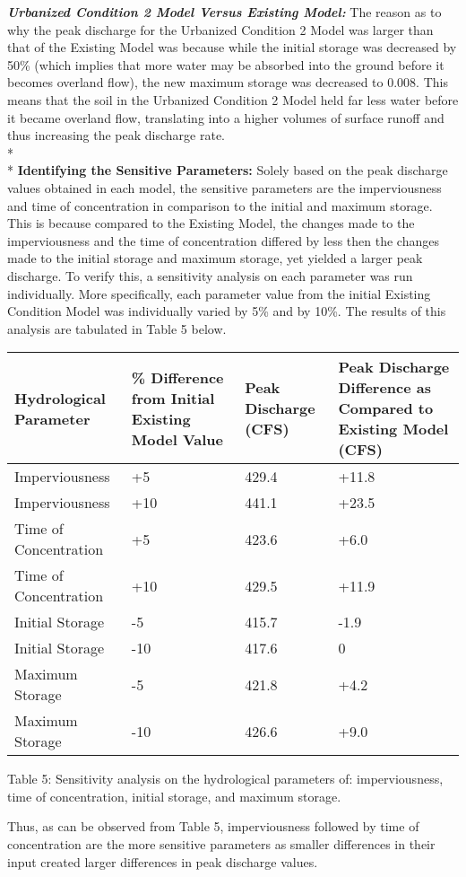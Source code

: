 \documentclass[]{article}
\begin{document}
\begin{enumerate}[label=\textbf{\arabic*.}]
	\textit{\textbf{Urbanized Condition 2 Model Versus Existing Model:}} The reason as to why the peak discharge for the Urbanized Condition 2 Model was larger than that of the Existing Model was because while the initial storage was decreased by 50\% (which implies that more water may be absorbed into the ground before it becomes overland flow), the new maximum storage was decreased to 0.008. This means that the soil in the Urbanized Condition 2 Model held far less water before it became overland flow, translating into a higher volumes of surface runoff and thus increasing the peak discharge rate. \\* \\* 
	\textbf{Identifying the Sensitive Parameters:} Solely based on the peak discharge values obtained in each model, the sensitive parameters are the imperviousness and time of concentration in comparison to the initial and maximum storage. This is because compared to the Existing Model, the changes made to the imperviousness and the time of concentration differed by less then the changes made to the initial storage and maximum storage, yet yielded a larger peak discharge. To verify this, a sensitivity analysis on each parameter was run individually. More specifically, each parameter value from the initial Existing Condition Model was individually varied by 5\% and by 10\%. The results of this analysis are tabulated in Table 5 below. 
	\vspace{0.5 cm}
	\begin{center}
		\begin{tabular}{|M{3cm}|M{3cm}|M{3cm}||M{4cm}|}
			\hline
			Hydrological Parameter & \% Difference from Initial Existing Model Value & Peak Discharge (CFS) & Peak Discharge Difference as Compared to Existing Model (CFS) \\ \hline \hline
			Imperviousness  & +5  & 429.4 & +11.8 \\ \hline
			Imperviousness &  +10   & 441.1  & +23.5 \\ \hline \hline
			Time of Concentration  & +5  & 423.6 & +6.0 \\ \hline
			Time of Concentration &  +10   & 429.5 & +11.9 \\ \hline \hline
			Initial Storage  & -5  & 415.7 &  -1.9 \\ \hline
			Initial Storage &  -10   & 417.6  & 0 \\ \hline \hline
			Maximum Storage  & -5  & 421.8 &  +4.2 \\ \hline
			Maximum Storage &  -10   & 426.6  & +9.0\\ \hline
		\end{tabular} 
	\end{center} 
	\begin{center} 
		Table 5: Sensitivity analysis on the hydrological parameters of: imperviousness, time of concentration, initial storage, and maximum storage.
	\end{center} \vspace{0.5 cm}
Thus, as can be observed from Table 5, imperviousness followed by time of concentration are the more sensitive parameters as smaller differences in their input created larger differences in peak discharge values.
\end{enumerate} 
\end{document}
